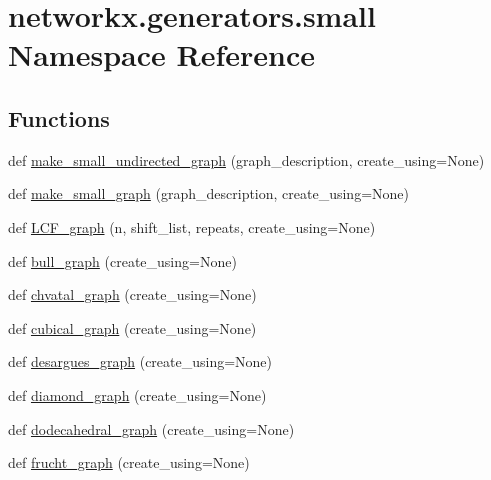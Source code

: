 \hypertarget{namespacenetworkx_1_1generators_1_1small}{}\section{networkx.\+generators.\+small Namespace Reference}
\label{namespacenetworkx_1_1generators_1_1small}
\subsection*{Functions}
\begin{DoxyCompactItemize}
\item 
def \hyperlink{namespacenetworkx_1_1generators_1_1small_a62acd86678337571139400132a2c92fc}{make\+\_\+small\+\_\+undirected\+\_\+graph} (graph\+\_\+description, create\+\_\+using=None)
\item 
def \hyperlink{namespacenetworkx_1_1generators_1_1small_a82aa279e09ad98f0e256fe604d609ee7}{make\+\_\+small\+\_\+graph} (graph\+\_\+description, create\+\_\+using=None)
\item 
def \hyperlink{namespacenetworkx_1_1generators_1_1small_ae2221baa82ade66b79f2194b96dc6c16}{L\+C\+F\+\_\+graph} (n, shift\+\_\+list, repeats, create\+\_\+using=None)
\item 
def \hyperlink{namespacenetworkx_1_1generators_1_1small_aab1031eb04038acdaa287ba7dbf76d2d}{bull\+\_\+graph} (create\+\_\+using=None)
\item 
def \hyperlink{namespacenetworkx_1_1generators_1_1small_aa6bf238ab5cb676560244e26d99a2752}{chvatal\+\_\+graph} (create\+\_\+using=None)
\item 
def \hyperlink{namespacenetworkx_1_1generators_1_1small_a363aca2509ce09e01b53356257cb6ba3}{cubical\+\_\+graph} (create\+\_\+using=None)
\item 
def \hyperlink{namespacenetworkx_1_1generators_1_1small_a8aea621793d2d9dd2e16df7a869a3afc}{desargues\+\_\+graph} (create\+\_\+using=None)
\item 
def \hyperlink{namespacenetworkx_1_1generators_1_1small_a56245a6e482f031ce3c0924e614bc841}{diamond\+\_\+graph} (create\+\_\+using=None)
\item 
def \hyperlink{namespacenetworkx_1_1generators_1_1small_a187043f9bfc0c9d8519fe89a3cd2459b}{dodecahedral\+\_\+graph} (create\+\_\+using=None)
\item 
def \hyperlink{namespacenetworkx_1_1generators_1_1small_ad0d5d48cbff4f6b8988dddd984e41532}{frucht\+\_\+graph} (create\+\_\+using=None)
\item 

\end{DoxyCompactItemize}
